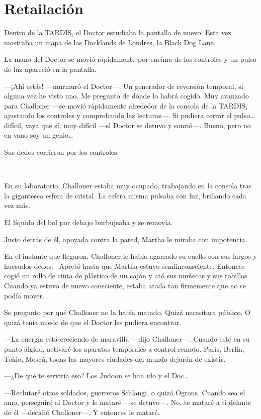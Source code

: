 \chapter*{Retailación}

Dentro de la TARDIS, el Doctor estudiaba la pantalla de nuevo. Esta vez
mostraba un mapa de las Docklands de Londres, la Black Dog Lane.

La mano del Doctor se movió rápidamente por encima de los controles y un
pulso de luz apareció en la pantalla.

---¡Ahí estás! ---murmuró el Doctor---. Un generador de reversión
temporal, si alguna vez he visto uno. Me pregunto de dónde lo habrá
cogido. Muy avanzado para Challoner ---se movió rápidamente alrededor de
la consola de la TARDIS, ajustando los controles y comprobando las
lecturas---. Si pudiera cerrar el pulso\ldots{} difícil, vaya que sí,
muy difícil ---el Doctor se detuvo y sonrió---. Bueno, pero no en vano
soy un genio\ldots{}

Sus dedos corrieron por los controles.

~

En su laboratorio, Challoner estaba muy ocupado, trabajando en la
consola tras la gigantesca esfera de cristal. La esfera misma pulsaba
con luz, brillando cada vez más.

El líquido del bol por debajo burbujeaba y se removía.

Justo detrás de él, apoyada contra la pared, Martha le miraba con
impotencia.

En el instante que llegaron, Challoner le había agarrado su cuello con
sus largos y huesudos dedos. ~Apretó hasta que Martha estuvo
semiinconsciente. Entonces cogió un rollo de cinta de plástico de un
cajón y ató sus muñecas y sus tobillos. Cuando ya estuvo de nuevo
consciente, estaba atada tan firmemente que no se podía mover.

Se pregunto por qué Challoner no la había matado. Quizá necesitara
público. O quizá tenía miedo de que el Doctor les pudiera encontrar.

---La energía está creciendo de maravilla ---dijo Challoner---. Cuando
esté en su punto álgido, activaré los aparatos temporales a control
remoto. París, Berlín, Tokio, Moscú, todas las mayores ciudades del
mundo dejarán de existir.

---¿De qué te serviría eso? Los Judoon se han ido y el Doc\ldots{}

---Reclutaré otros soldados, guerreros Schlangi, o quizá Ogrons. Cuando
sea el amo, perseguiré al Doctor y le mataré ---se detuvo---. No, te
mataré a ti delante de él ---decidió Challoner---. Y entonces le mataré.

